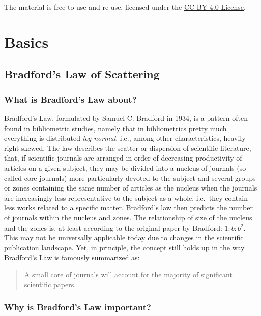 \documentclass[
  letterpaper,
]{scrreprt}
\begin{document}
The material is free to use and re-use, licensed under the
\href{https://creativecommons.org/licenses/by/4.0/deed.en}{CC BY 4.0
License}.

\part{Basics}

\chapter{Bradford's Law of
Scattering}\label{bradfords-law-of-scattering}

\section{What is Bradford's Law
about?}\label{what-is-bradfords-law-about}

Bradford's Law, formulated by Samuel C. Bradford in 1934, is a pattern
often found in bibliometric studies, namely that in bibliometrics pretty
much everything is distributed \emph{log-normal}, i.e., among other
characteristics, heavily right-skewed. The law describes the scatter or
dispersion of scientific literature, that, if scientific journals are
arranged in order of decreasing productivity of articles on a given
subject, they may be divided into a nucleus of journals (so-called core
journals) more particularly devoted to the subject and several groups or
zones containing the same number of articles as the nucleus when the
journals are increasingly less representative to the subject as a whole,
i.e.~they contain less works related to a specific matter. Bradford's
law then predicts the number of journals within the nucleus and zones.
The relationship of size of the nucleus and the zones is, at least
according to the original paper by Bradford: \(1:b:b^2\). This may not
be universally applicable today due to changes in the scientific
publication landscape. Yet, in principle, the concept still holds up in
the way Bradford's Law is famously summarized as:

\begin{quote}
A small core of journals will account for the majority of significant
scientific papers.
\end{quote}

\section{Why is Bradford's Law
important?}\label{why-is-bradfords-law-important}
\end{document}
